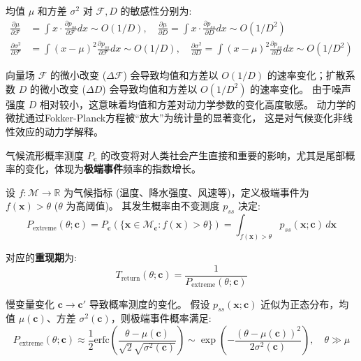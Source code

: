 \documentclass[12pt, a4paper]{article}
\newcommand{\R}{\mathbb{R}}
\newcommand{\manifold}{\mathcal{M}}
\newcommand{\measure}{P}
\newcommand{\fastvar}{\bm{x}}          %
\newcommand{\slowvar}{\bm{c}}          %
\newcommand{\drift}{\mathcal{F}}  %
\newcommand{\difftensor}{D}       %
\newcommand{\probdens}{p}           %
\newcommand{\meanval}{\mu}          %
\newcommand{\variance}{\sigma^2}    %
\newcommand{\climind}{f}         %
\newcommand{\threshold}{\theta}  %
\begin{document}
均值 $\meanval$ 和方差 $\variance$ 对 $\drift, \difftensor$ 的敏感性分别为:
\begin{align}
\label{eq:sensitivity_mean}
    \frac{\partial \meanval}{\partial \drift} &= \int x \cdot \frac{\partial \probdens_{ss}}{\partial \drift} dx \sim O(1/\difftensor), \quad \frac{\partial \meanval}{\partial \difftensor} = \int x \cdot \frac{\partial \probdens_{ss}}{\partial \difftensor} dx \sim O(1/\difftensor^2) \\
\label{eq:sensitivity_variance}
    \frac{\partial \variance}{\partial \drift} &= \int (x - \meanval)^2 \frac{\partial \probdens_{ss}}{\partial \drift} dx \sim O(1/\difftensor), \quad \frac{\partial \variance}{\partial \difftensor} = \int (x - \meanval)^2 \frac{\partial \probdens_{ss}}{\partial \difftensor} dx \sim O(1/\difftensor^2)
\end{align}

向量场 $\drift$ 的微小改变 ($\Delta \drift$) 会导致均值和方差以 $O(1/\difftensor)$ 的速率变化；扩散系数 $\difftensor$ 的微小改变 ($\Delta \difftensor$) 会导致均值和方差以 $O(1/\difftensor^2)$ 的速率变化。
由于噪声强度 $\difftensor$ 相对较小，这意味着均值和方差对动力学参数的变化高度敏感。
动力学的微扰通过Fokker-Planck方程被“放大”为统计量的显著变化，
这是对气候变化非线性效应的动力学解释。

气候流形概率测度 $\measure_{\slowvar}$ 的改变将对人类社会产生直接和重要的影响，尤其是尾部概率的变化，体现为\textbf{极端事件}频率的指数增长。

设 $\climind: \manifold \to \R$ 为气候指标 (温度、降水强度、风速等)，定义极端事件为 $\climind(\fastvar) > \threshold$ ($\threshold$ 为高阈值)。
其发生概率由不变测度 $\probdens_{ss}$ 决定:
\begin{equation}
\label{eq:extreme_prob}
    P_{\text{extreme}}(\threshold; \slowvar) = \measure_{\slowvar}(\{\fastvar \in \manifold_{\slowvar} : \climind(\fastvar) > \threshold\}) = \int_{\climind(\fastvar) > \threshold} \probdens_{ss}(\fastvar; \slowvar) \, d\fastvar
\end{equation}

对应的\textbf{重现期}为:
\begin{equation}
\label{eq:return_period}
    T_{\text{return}}(\threshold; \slowvar) = \frac{1}{P_{\text{extreme}}(\threshold; \slowvar)}
\end{equation}

慢变量变化 $\slowvar \to \slowvar'$ 导致概率测度的变化。
假设 $\probdens_{ss}(\fastvar; \slowvar)$ 近似为正态分布，均值 $\meanval(\slowvar)$、方差 $\variance(\slowvar)$，则极端事件概率满足:
\begin{equation}
\label{eq:extreme_prob_normal}
    P_{\text{extreme}}(\threshold; \slowvar) \approx \frac{1}{2}\mathrm{erfc}\left(\frac{\threshold - \meanval(\slowvar)}{\sqrt{2}\sqrt{\variance(\slowvar)}}\right) \sim \exp\left(-\frac{(\threshold - \meanval(\slowvar))^2}{2\variance(\slowvar)}\right), \quad \threshold \gg \meanval
\end{equation}
\end{document}
